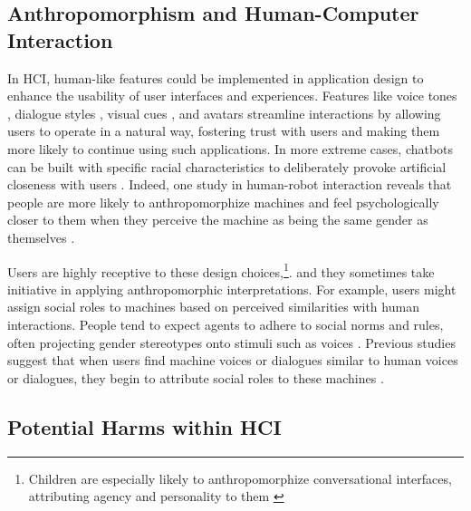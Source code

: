 \subsection{Anthropomorphism and Human-Computer Interaction}

In HCI, human-like features could be implemented in application design to enhance the usability of user interfaces and experiences. Features like voice tones \citep{chang2018stereotypes}, dialogue styles \citep{hoegen2019end-to-end,yan2024talk}, visual cues \citep{go2019humanizing}, and avatars \citep{park2023generative} streamline interactions by allowing users to operate in a natural way, fostering trust with users and making them more likely to continue using such applications. In more extreme cases, chatbots can be built with specific racial characteristics to deliberately provoke artificial closeness with users \citep{liao2020racial}. Indeed, one study in human-robot interaction reveals that people are more likely to anthropomorphize machines and feel psychologically closer to them when they perceive the machine as being the same gender as themselves \citep{eyssel2012if}. 

Users are highly receptive to these design choices,\footnote{Children are especially likely to anthropomorphize conversational interfaces, attributing agency and personality to them \citep{lee2021conversational}}. and they sometimes take initiative in applying anthropomorphic interpretations. For example, users might assign social roles to machines based on perceived similarities with human interactions. People tend to expect agents to adhere to social norms and rules, often projecting gender stereotypes onto stimuli such as voices \citep{reeves1996media, abercrombie-etal-2021-alexa, shiramizu2022role}. Previous studies suggest that when users find machine voices or dialogues similar to human voices or dialogues, they begin to attribute social roles to these machines \citep{nass2000machines,nass2000does}.


\subsection{Potential Harms within HCI}

